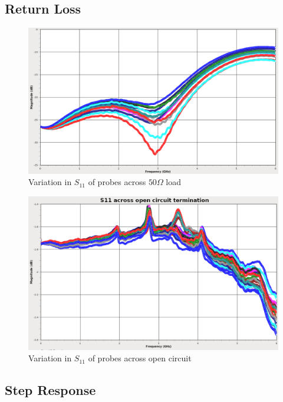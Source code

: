 \documentclass[11pt]{article}
\begin{document}
\pagebreak
\subsection{Return Loss}

\begin{figure}[h!]
\centering
\includegraphics[width=14cm]{s11-variation.png}
\caption{Variation in $S_{11}$ of probes across $50\Omega$ load}
\label{s11-open-variation}
\end{figure}

\begin{figure}[h!]
\centering
\includegraphics[width=14cm]{s11-open-variation.png}
\caption{Variation in $S_{11}$ of probes across open circuit}
\label{s11-variation}
\end{figure}

\FloatBarrier

\pagebreak
\subsection{Step Response}
\end{document}

